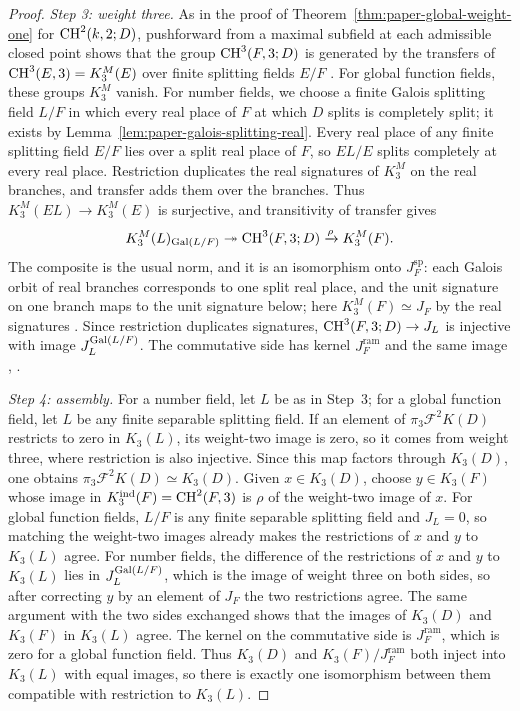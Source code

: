 \begin{proof}
\emph{Step 3: weight three.}
As in the proof of Theorem~\ref{thm:paper-global-weight-one} for $\operatorname{CH}^2(k,2;D)$, pushforward from a maximal subfield at each admissible closed point shows that the group $\operatorname{CH}^3(F,3;D)$ is generated by the transfers of $\operatorname{CH}^3(E,3)=K_3^M(E)$ over finite splitting fields $E/F$ \cite{NesterenkoSuslin}.
For global function fields, these groups $K_3^M$ vanish.
For number fields, we choose a finite Galois splitting field $L/F$ in which every real place of $F$ at which $D$ splits is completely split; it exists by Lemma~\ref{lem:paper-galois-splitting-real}.
Every real place of any finite splitting field $E/F$ lies over a split real place of $F$, so $EL/E$ splits completely at every real place.
Restriction duplicates the real signatures of $K_3^M$ on the real branches, and transfer adds them over the branches.
Thus $K_3^M(EL)\to K_3^M(E)$ is surjective, and transitivity of transfer gives
\[
 K_3^M(L)_{\operatorname{Gal}(L/F)}\twoheadrightarrow \operatorname{CH}^3(F,3;D)
      \xrightarrow{\rho} K_3^M(F).
\]
The composite is the usual norm, and it is an isomorphism onto $J_{F}^{\mathrm{sp}}$: each Galois orbit of real branches corresponds to one split real place, and the unit signature on one branch maps to the unit signature below; here $K_3^M(F)\simeq J_F$ by the real signatures \cite{BassTate}.
Since restriction duplicates signatures, $\operatorname{CH}^3(F,3;D)\to J_L$ is injective with image $J_L^{\operatorname{Gal}(L/F)}$.
The commutative side has kernel $J_{F}^{\mathrm{ram}}$ and the same image \cite[Chapter II, Theorem 2.1(3)]{BassTate}, \cite[Lemmas 6.6.3--6.6.4]{KahnLevine2010}.

\emph{Step 4: assembly.}
For a number field, let $L$ be as in Step~3; for a global function field, let $L$ be any finite separable splitting field.
If an element of $\pi_3\mathcal{F}^2K(D)$ restricts to zero in $K_3(L)$, its weight-two image is zero, so it comes from weight three, where restriction is also injective.
Since this map factors through $K_3(D)$, one obtains $\pi_3\mathcal{F}^2K(D)\simeq K_3(D)$.
Given $x\in K_3(D)$, choose $y\in K_3(F)$ whose image in $K_3^{\mathrm{ind}}(F)=\operatorname{CH}^2(F,3)$ is $\rho$ of the weight-two image of $x$.
For global function fields, $L/F$ is any finite separable splitting field and $J_L=0$, so matching the weight-two images already makes the restrictions of $x$ and $y$ to $K_3(L)$ agree.
For number fields, the difference of the restrictions of $x$ and $y$ to $K_3(L)$ lies in $J_L^{\operatorname{Gal}(L/F)}$, which is the image of weight three on both sides, so after correcting $y$ by an element of $J_F$ the two restrictions agree.
The same argument with the two sides exchanged shows that the images of $K_3(D)$ and $K_3(F)$ in $K_3(L)$ agree.
The kernel on the commutative side is $J_F^{\mathrm{ram}}$, which is zero for a global function field.
Thus $K_3(D)$ and $K_3(F)/J_F^{\mathrm{ram}}$ both inject into $K_3(L)$ with equal images, so there is exactly one isomorphism between them compatible with restriction to $K_3(L)$.


\end{proof}

